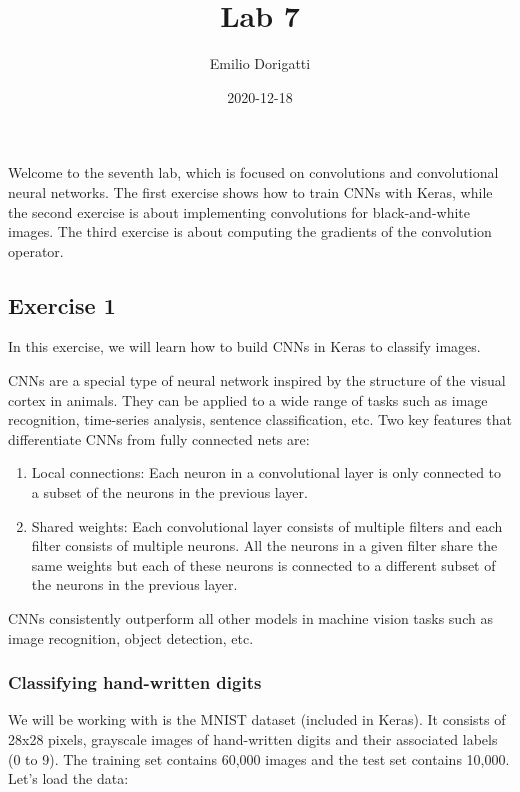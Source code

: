 \documentclass[
  a4paper,
]{article}
\title{Lab 7}
\author{Emilio Dorigatti}
\date{2020-12-18}
\providecommand{\tightlist}{%
  \setlength{\itemsep}{0pt}\setlength{\parskip}{0pt}}
\begin{document}
\maketitle

Welcome to the seventh lab, which is focused on convolutions and
convolutional neural networks. The first exercise shows how to train
CNNs with Keras, while the second exercise is about implementing
convolutions for black-and-white images. The third exercise is about
computing the gradients of the convolution operator.

\hypertarget{exercise-1}{%
\subsection{Exercise 1}\label{exercise-1}}

In this exercise, we will learn how to build CNNs in Keras to classify
images.

CNNs are a special type of neural network inspired by the structure of
the visual cortex in animals. They can be applied to a wide range of
tasks such as image recognition, time-series analysis, sentence
classification, etc. Two key features that differentiate CNNs from fully
connected nets are:

\begin{enumerate}
\def\labelenumi{\arabic{enumi}.}
\tightlist
\item
  Local connections: Each neuron in a convolutional layer is only
  connected to a subset of the neurons in the previous layer.
\item
  Shared weights: Each convolutional layer consists of multiple filters
  and each filter consists of multiple neurons. All the neurons in a
  given filter share the same weights but each of these neurons is
  connected to a different subset of the neurons in the previous layer.
\end{enumerate}

CNNs consistently outperform all other models in machine vision tasks
such as image recognition, object detection, etc.

\hypertarget{classifying-hand-written-digits}{%
\subsubsection{Classifying hand-written
digits}\label{classifying-hand-written-digits}}

We will be working with is the MNIST dataset (included in Keras). It
consists of 28x28 pixels, grayscale images of hand-written digits and
their associated labels (0 to 9). The training set contains 60,000
images and the test set contains 10,000. Let's load the data:
\end{document}
